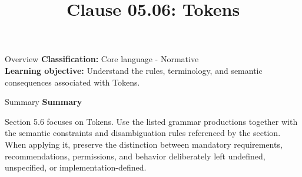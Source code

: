\documentclass[10pt,letterpaper]{article}
\title{Clause 05.06: Tokens}
\author{}
\date{}
\begin{document}
\maketitle
\begin{CornellOverviewBox}{Overview}
\textbf{Classification:} Core language - Normative\\[2pt]
\textbf{Learning objective:} Understand the rules, terminology, and semantic consequences associated with Tokens.
\end{CornellOverviewBox}\begin{CornellSummaryBox}{Summary}
{\sffamily\bfseries\color{Accent} Summary}\par\vspace{3pt}Section 5.6 focuses on Tokens. Use the listed grammar productions together with the semantic constraints and disambiguation rules referenced by the section. When applying it, preserve the distinction between mandatory requirements, recommendations, permissions, and behavior deliberately left undefined, unspecified, or implementation-defined.
\end{CornellSummaryBox}
\end{document}
